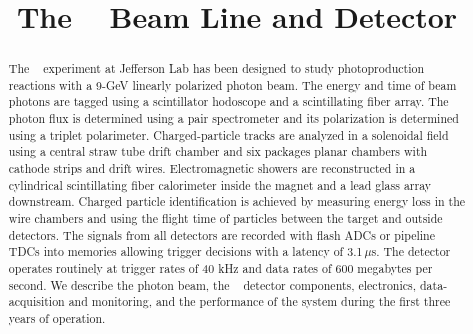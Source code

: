 \documentclass{elsarticle}
\begin{document}
  


  
\begin{frontmatter} 


\title{The \gx~ Beam Line and Detector}





\begin{abstract}
The \gx~ experiment at Jefferson Lab has been designed to study photoproduction reactions with a 9-GeV linearly polarized photon beam. The energy and time of beam photons are tagged using a scintillator
hodoscope and a scintillating fiber array. The photon flux is determined using a pair spectrometer and its polarization is determined using a triplet polarimeter. 
Charged-particle tracks are analyzed in a solenoidal field using a central straw tube
drift chamber and six packages planar chambers with cathode strips and drift wires. Electromagnetic showers are reconstructed in a cylindrical scintillating fiber calorimeter inside the magnet and
a lead glass array downstream. Charged particle identification is achieved by measuring energy loss in the wire chambers and using the flight time of particles between the target and outside 
detectors. The signals from all detectors are recorded with flash ADCs or pipeline TDCs into memories allowing trigger decisions with a latency of 3.1\,$\mu$s. The detector operates routinely at
trigger rates of 40 kHz and data rates of 600 megabytes per second. We describe the photon beam, the \gx~ detector components, electronics, data-acquisition and monitoring, and the performance of the system during the first three 
years of operation.
\end{abstract}   


\end{frontmatter}

  
   

\end{document}
